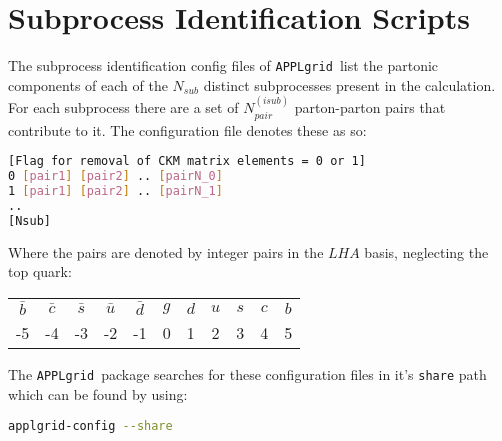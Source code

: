 \documentclass[11pt]{article}
\newcommand{\appl} {{\tt APPLgrid }}
\begin{document}
\clearpage
\appendix
\section{Subprocess Identification Scripts}
The subprocess identification config files of \appl list the partonic components of each of the $N_{sub}$ distinct subprocesses present in the calculation. For each subprocess there are a set of $N_{pair}^{(isub)}$ parton-parton pairs that contribute to it. The configuration file denotes these as so:

\begin{lstlisting}[language=bash]
[Flag for removal of CKM matrix elements = 0 or 1]
0 [pair1] [pair2] .. [pairN_0]
1 [pair1] [pair2] .. [pairN_1]
..
[Nsub]  
\end{lstlisting}
Where the pairs are denoted by integer pairs in the $LHA$ basis, neglecting the top quark:\\
\begin{table}[h]
\centering
\begin{tabular}{c c c c c c c c c c c }
  $\bar{b}$ & $\bar{c}$ & $\bar{s}$ & $\bar{u}$ & $\bar{d}$ & $g$ & $d$ & $u$ & $s$ & $c$ & $b$ \\
  -5 & -4 & -3 & -2 & -1 & 0 & 1 & 2 & 3 & 4 & 5 \\
\end{tabular}
\end{table}

The \appl package searches for these configuration files in it's \lstinline[language=bash]{share} path which can be found by using:
\begin{lstlisting}[language=bash]
applgrid-config --share
\end{lstlisting}
\end{document}
